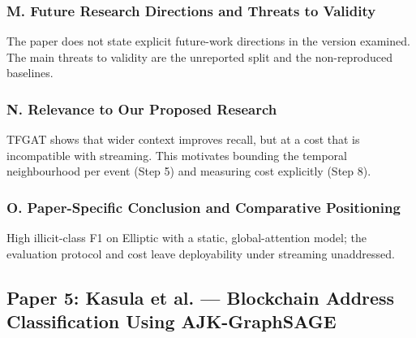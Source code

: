 \documentclass[11pt,a4paper]{article}
\begin{document}
\subsubsection*{M. Future Research Directions and Threats to Validity}
The paper does not state explicit future-work directions in the version examined. The main threats to validity are the unreported split and the non-reproduced baselines.

\subsubsection*{N. Relevance to Our Proposed Research}
TFGAT shows that wider context improves recall, but at a cost that is incompatible with streaming. This motivates bounding the temporal neighbourhood per event (Step 5) and measuring cost explicitly (Step 8).

\subsubsection*{O. Paper-Specific Conclusion and Comparative Positioning}
High illicit-class F1 on Elliptic with a static, global-attention model; the evaluation protocol and cost leave deployability under streaming unaddressed.

\subsection{Paper 5: Kasula et al. --- Blockchain Address Classification Using AJK-GraphSAGE}
\label{sec:p5_kasula}
\end{document}
